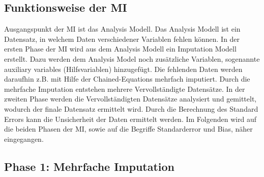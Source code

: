 \subsection{Funktionsweise der MI}

Ausgangspunkt der MI ist das Analysis Modell. Das Analysis Modell ist ein Datensatz, in welchem Daten verschiedener Variablen 
fehlen können. In der ersten Phase der MI wird aus dem Analysis Modell ein Imputation Modell erstellt. Dazu werden dem 
Analysis Model noch zusätzliche Variablen, sogenannte auxiliary variables (Hilfsvariablen) hinzugefügt. Die fehlenden 
Daten werden daraufhin z.B. mit Hilfe der Chained-Equations mehrfach imputiert. Durch die mehrfache Imputation entstehen 
mehrere Vervollständigte Datensätze. In der zweiten Phase werden die Vervollständigten Datensätze analysiert und gemittelt, 
wodurch der finale Datensatz ermittelt wird. Durch die Berechnung des Standard Errors kann die Unsicherheit der Daten 
ermittelt werden. \autocite[163]{Lee2014} Im Folgenden wird auf die beiden Phasen der MI, sowie auf die Begriffe Standarderror und Bias, näher eingegangen.

\subsection{Phase 1: Mehrfache Imputation}

